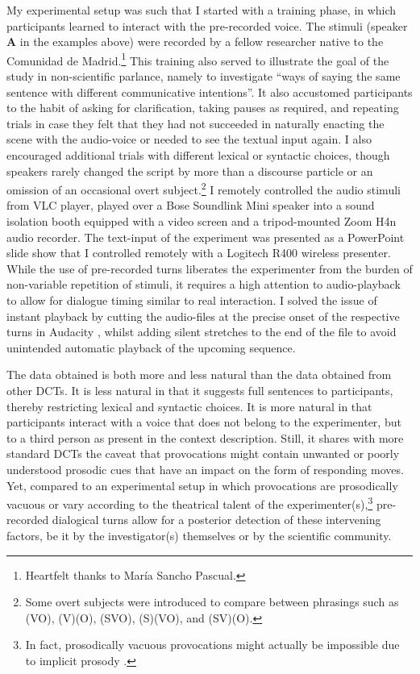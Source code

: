 My experimental setup was such that I started with a training phase, in which participants learned to interact with the pre-recorded voice. The stimuli (speaker \textbf{A} in the examples above) were recorded by a fellow researcher native to the Comunidad de Madrid.\footnote{Heartfelt thanks to María Sancho Pascual.} This training also served to illustrate the goal of the study in non-scientific parlance, namely to investigate ``ways of saying the same sentence with different communicative intentions''. It also accustomed participants to the habit of asking for clarification, taking pau\-ses as required, and repeating trials in case they felt that they had not succeeded in naturally enacting the scene with the audio-voice or needed to see the textual input again. I also encouraged additional trials with different lexical or syntactic choices, though speakers rarely changed the script by more than a discourse particle or an omission of an occasional overt subject.\footnote{Some overt subjects were introduced to compare between phrasings such as (VO), (V)(O), (SVO), (S)(VO), and (SV)(O).} I remotely controlled the audio stimuli from VLC player, played over a Bose Soundlink Mini speaker into a sound isolation booth equipped with a video screen and a tripod-mounted Zoom H4n audio recorder. The text-input of the experiment was presented as a PowerPoint slide show that I controlled remotely with a Logitech R400 wireless presenter. While the use of pre-recorded turns liberates the experimenter from the burden of non-variable repetition of stimuli, it requires a high attention to audio-playback to allow for dialogue timing similar to real interaction. I solved the issue of instant playback by cutting the audio-files at the precise onset of the respective turns in Audacity \citep{AudacityTeam}, whilst adding silent stretches to the end of the file to avoid unintended automatic playback of the upcoming sequence.

The data obtained is both more and less natural than the data obtained from other \acp{DCT}. It is less natural in that it suggests full sentences to participants, thereby restricting lexical and syntactic choices. It is more natural in that participants interact with a voice that does not belong to the experimenter, but to a third person as present in the context description. Still, it shares with more standard \acp{DCT} the caveat that provocations might contain unwanted or poorly understood prosodic cues that have an impact on the form of responding moves. Yet, compared to an experimental setup in which provocations are prosodically vacuous or vary according to the theatrical talent of the experimenter(s),\footnote{In fact, prosodically vacuous provocations might actually be impossible due to implicit prosody \citep{SpeerFoltz.2015,Breen.2015}.} pre-recorded dialogical turns allow for a posterior detection of these intervening factors, be it by the investigator(s) themselves or by the scientific community.

